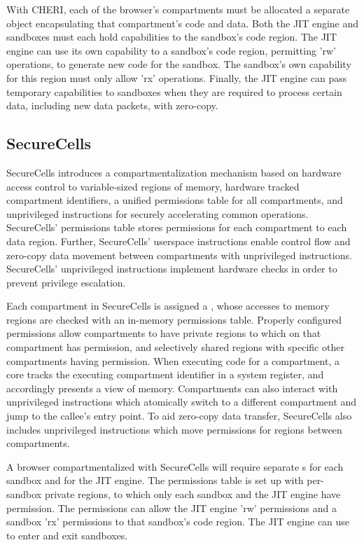 With CHERI, each of the browser's compartments must be allocated a separate
object encapsulating that compartment's code and data.
Both the JIT engine and sandboxes must each hold capabilities to the
sandbox's code region. 
The JIT engine can use its own capability to a sandbox's code region,
permitting 'rw' operations, to generate new code for the sandbox.
The sandbox's own capability for this region must only allow 'rx' operations.
Finally, the JIT engine can pass temporary capabilities to sandboxes
when they are required to process certain data, including new data packets,
with zero-copy.

\subsection{SecureCells}
SecureCells introduces a compartmentalization mechanism based on hardware
access control to variable-sized regions of memory, hardware tracked
compartment identifiers, a unified permissions table for all compartments,
and unprivileged instructions for securely accelerating common operations.
SecureCells' permissions table stores permissions for each compartment to
each data region.
Further, SecureCells' userspace instructions enable control flow and
zero-copy data movement between compartments with unprivileged instructions.
SecureCells' unprivileged instructions implement hardware checks in order
to prevent privilege escalation.

Each compartment in SecureCells is assigned a \secdiv{}, whose accesses
to memory regions are checked with an in-memory permissions table.
Properly configured permissions allow compartments to have private regions
to which on that compartment has permission, and selectively shared regions
with specific other compartments having permission. 
When executing code for a compartment, a core tracks the executing compartment
identifier in a system register, and accordingly presents a view of memory.
Compartments can also interact with unprivileged  instructions
which atomically  switch to a different compartment and jump to the callee's
entry point.
To aid zero-copy data transfer, SecureCells also includes unprivileged instructions
which move permissions for regions between compartments.

A browser compartmentalized with SecureCells will require separate
\secdiv{}s for each sandbox and for the JIT engine.
The permissions table is set up with per-sandbox private regions, to which
only each sandbox and the JIT engine have permission.
The permissions can allow the JIT engine 'rw' permissions and a sandbox
'rx' permissions to that sandbox's code region.
The JIT engine can use  to enter and exit sandboxes.

